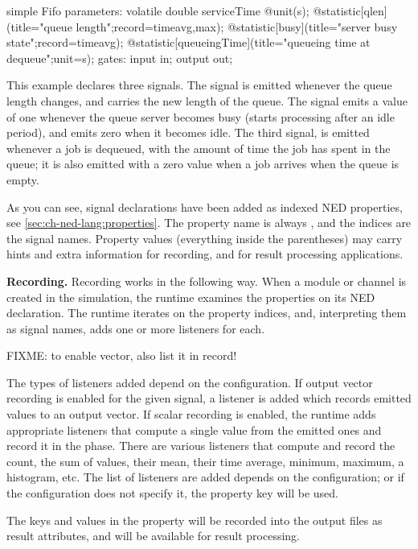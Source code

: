 \begin{ned}
simple Fifo
{
    parameters:
        volatile double serviceTime @unit(s);
        @statistic[qlen](title="queue length";record=timeavg,max);
        @statistic[busy](title="server busy state";record=timeavg);
        @statistic[queueingTime](title="queueing time at dequeue";unit=s);
    gates:
        input in;
        output out;
}
\end{ned}

This example declares three signals. The  signal is emitted
whenever the queue length changes, and carries the new length of the queue.
The  signal emits a value of one whenever the queue server
becomes busy (starts processing after an idle period), and emits zero when
it becomes idle. The third signal,  is emitted whenever a
job is dequeued, with the amount of time the job has spent in the queue; it
is also emitted with a zero value when a job arrives when the queue is
empty.

As you can see, signal declarations have been added as indexed NED
properties, see \ref{sec:ch-ned-lang:properties}. The property name is
always , and the indices are the signal names. Property values
(everything inside the parentheses) may carry hints and extra information
for recording, and for result processing applications.

\textbf{Recording.} Recording works in the following way. When a module or
channel is created in the simulation, the {\opp} runtime examines the
 properties on its NED declaration. The runtime iterates on
the property indices, and, interpreting them as signal names, adds one or
more listeners for each.

FIXME: to enable vector, also list it in record!

The types of listeners added depend on the configuration. If output vector
recording is enabled for the given signal, a listener is added which
records emitted values to an output vector. If scalar recording is enabled,
the runtime adds appropriate listeners that compute a single value from the
emitted ones and record it in the  phase. There are various
listeners that compute and record the count, the sum of values, their mean,
their time average, minimum, maximum, a histogram, etc. The list of
listeners are added depends on the configuration; or if the configuration
does not specify it, the  property key will be used.

The keys and values in the property will be recorded into the output files
as result attributes, and will be available for result processing.

